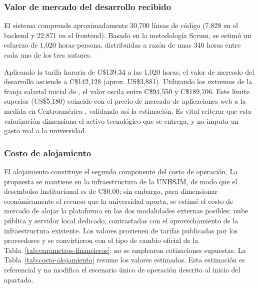 \subsubsection{Valor de mercado del desarrollo recibido}

El sistema comprende aproximadamente 30,700 líneas de código (7,828 en el backend y 22,871 en el frontend). Basado en la metodología Scrum, se estimó un esfuerzo de 1,020 horas-persona, distribuidas a razón de unas 340 horas entre cada uno de los tres autores.

Aplicando la tarifa horaria de C\$139.34 a las 1,020 horas, el valor de mercado del desarrollo asciende a C\$142,128 (aprox. US\$3,881). Utilizando los extremos de la franja salarial inicial de \textcite{wageindicator2026}, el valor oscila entre C\$94,550 y C\$189,706. Este límite superior (US\$5,180) coincide con el precio de mercado de aplicaciones web a la medida en Centroamérica \parencite{meanconsultors2026}, validando así la estimación. Es vital reiterar que esta valorización dimensiona el activo tecnológico que se entrega, y no imputa un gasto real a la universidad.

\subsubsection{Costo de alojamiento}

El alojamiento constituye el segundo componente del costo de operación. La propuesta se mantiene en la infraestructura de la UNHSJM, de modo que el desembolso institucional es de C\$0.00; sin embargo, para dimensionar económicamente el recurso que la universidad aporta, se estimó el costo de mercado de alojar la plataforma en las dos modalidades externas posibles: nube pública y servidor local dedicado, contrastadas con el aprovechamiento de la infraestructura existente. Los valores provienen de tarifas publicadas por los proveedores y se convirtieron con el tipo de cambio oficial de la Tabla~\ref{tab:parametros-financieros}; no se emplearon cotizaciones supuestas. La Tabla~\ref{tab:costo-alojamiento} resume los valores estimados. Esta estimación es referencial y no modifica el escenario único de operación descrito al inicio del apartado.

\clearpage

